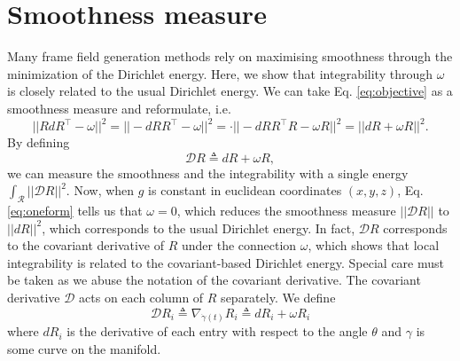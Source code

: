 \documentclass[../thesis.tex]{subfiles}
\begin{document}
\section{Smoothness measure}
Many frame field generation methods rely on maximising smoothness through
the minimization of the Dirichlet energy.
Here, we show that integrability through $\omega$ is closely related to the usual
Dirichlet energy.
We can take Eq. \ref{eq:objective} as a smoothness measure and reformulate, i.e.
\begin{equation}\label{eq:smoothness}
  ||RdR^{\top}-\omega||^2 = ||-dRR^{\top} - \omega||^2 = \cdot||-dRR^{\top}R-\omega R||^2 = ||dR+ \omega R||^2.
\end{equation}
By defining
\begin{equation}
  \mathcal{D}R \triangleq dR + \omega R,
\end{equation}
we can measure the smoothness and the integrability with a single energy $\int_{\mathcal{R}}||\mathcal{D}R||^2$.
Now, when $g$ is constant in euclidean coordinates $(x,y,z)$, Eq. \ref{eq:oneform} tells us
that $\omega = 0$, which reduces the smoothness measure $||\mathcal{D}R||$ to 
$||dR||^2$, which corresponds to the usual Dirichlet energy.
In fact, $\mathcal{D}R$ corresponds to the covariant derivative of $R$ under
the connection $\omega$, which shows that local integrability is related
to the covariant-based Dirichlet energy.
Special care must be taken as we abuse the notation of the covariant derivative. The
covariant derivative $\mathcal{D}$ acts on each column of $R$ separately.
We define 
$$\mathcal{D}R_i \triangleq \nabla_{\dot{\gamma}(t)}R_i \triangleq dR_i + \omega R_i$$
where $dR_i$ is the derivative of each entry with respect to the angle $\theta$ and $\gamma$ is some curve on the manifold.
\end{document}
